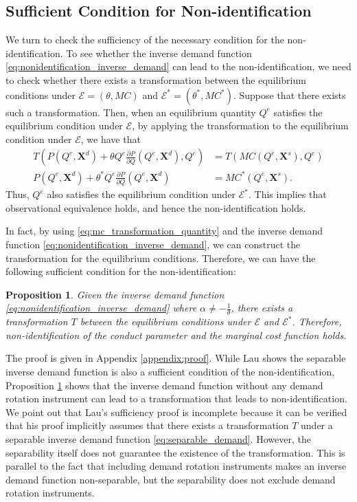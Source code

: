 \documentclass[11pt, a4paper]{article}
\newtheorem{proposition}{Proposition}
\begin{document}
\subsection{Sufficient Condition for Non-identification}\label{subsec:sufficient_condition_nonidentification}
We turn to check the sufficiency of the necessary condition for the non-identification.
To see whether the inverse demand function \eqref{eq:nonidentification_inverse_demand} can lead to the non-identification, we need to check whether there exists a transformation between the equilibrium conditions under $\mathcal{E} =(\theta, MC)$ and $\mathcal{E}^{*} =(\theta^{*}, MC^{*})$.
Suppose that there exists such a transformation.
Then, when an equilibrium quantity $Q^e$ satisfies the equilibrium condition under $\mathcal{E}$, by applying the transformation to the equilibrium condition under $\mathcal{E}$, we have that
\begin{align}
    T\left(P(Q^e, \bm{X}^{d}) + \theta Q^e \frac{\partial P}{\partial Q}(Q^e, \bm{X}^{d}), Q^e\right)&= T\left(MC(Q^e, \bm{X}^{s}), Q^e\right)\\
    P(Q^e, \bm{X}^{d}) + \theta^{*} Q^e \frac{\partial P}{\partial Q}(Q^e, \bm{X}^{d})&= MC^{*}(Q^e, \bm{X}^{s}).
\end{align}
Thus, $Q^e$ also satisfies the equilibrium condition under $\mathcal{E}^{*}$.
This implies that observational equivalence holds, and hence the non-identification holds.

In fact, by using \eqref{eq:mc_transformation_quantity} and the inverse demand function \eqref{eq:nonidentification_inverse_demand}, we can construct the transformation for the equilibrium conditions.
Therefore, we can have the following sufficient condition for the non-identification:
\begin{proposition}\label{proposition:sufficient_nonidentification}
    Given the inverse demand function \eqref{eq:nonidentification_inverse_demand} where $\alpha \ne -\frac{1}{\theta}$, there exists a transformation $T$ between the equilibrium conditions under $\mathcal{E}$ and $\mathcal{E}^{*}$.
    Therefore, non-identification of the conduct parameter and the marginal cost function holds.
\end{proposition}
The proof is given in Appendix \ref{appendix:proof}.
While Lau shows the separable inverse demand function is also a sufficient condition of the non-identification, Proposition \ref{proposition:sufficient_nonidentification} shows that the inverse demand function without any demand rotation instrument can lead to a transformation that leads to non-identification.
We point out that Lau's sufficiency proof is incomplete because it can be verified that his proof implicitly assumes that there exists a transformation $T$ under a separable inverse demand function \eqref{eq:separable_demand}.
However, the separability itself does not guarantee the existence of the transformation.
This is parallel to the fact that including demand rotation instruments makes an inverse demand function non-separable, but the separability does not exclude demand rotation instruments.
\end{document}
